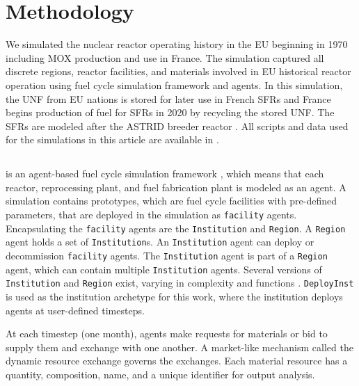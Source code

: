
\section{Methodology}
We simulated the nuclear reactor operating history in the \gls{EU} beginning in 
1970 including \gls{MOX} production and use in France. 
The simulation captured all discrete regions, reactor facilities, and materials 
involved in \gls{EU} historical reactor operation
using \Cyclus fuel cycle simulation framework and \Cycamore agents.
In this simulation, the \gls{UNF} from \gls{EU} nations is stored for later use 
in French \glspl{SFR} and France begins production of fuel for \glspl{SFR}
in 2020 by recycling the stored \gls{UNF}.
The \glspl{SFR} are modeled after the \gls{ASTRID} breeder reactor \cite{varaine_pre-conceptual_2012}. All scripts and data used for the simulations in this article are available in 
\cite{bae_arfc/transition-scenarios:_2018}.


\subsection{\Cyclus}

\Cyclus is an agent-based fuel cycle simulation framework 
\cite{huff_fundamental_2016}, which means 
that each reactor, reprocessing plant, and fuel fabrication plant is modeled as an agent.
A \Cyclus simulation contains prototypes, which are fuel cycle facilities with
pre-defined parameters, that are deployed in the simulation as \texttt{facility} agents.
Encapsulating the \texttt{facility} agents are the \texttt{Institution} and \texttt{Region}.
A \texttt{Region} agent holds a set of \texttt{Institution}s. 
An \texttt{Institution} agent can deploy or decommission \texttt{facility} agents.
The \texttt{Institution} agent is part of a \texttt{Region} agent,
which can contain multiple \texttt{Institution} agents. Several versions of \texttt{Institution}
and \texttt{Region} exist, varying in complexity and functions \cite{huff_extensions_2014}.
 \texttt{DeployInst} is used as the institution archetype for this work, where the institution
deploys agents at user-defined timesteps. 

At each timestep (one month),
agents make requests for materials or bid to supply them and exchange
with one another. A market-like mechanism called the dynamic resource exchange
\cite{gidden_agent-based_2015} governs the exchanges.
Each material resource has a quantity, composition, name, and a unique identifier
for output analysis. 

